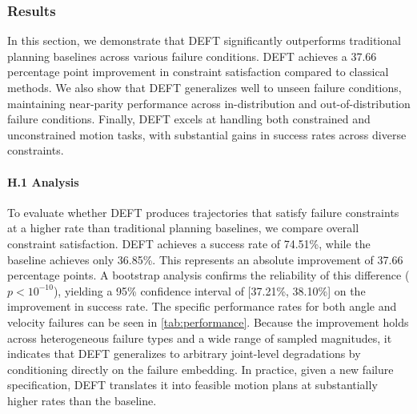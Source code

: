 \subsubsection{Results} \label{sec:sim-results}
In this section, we demonstrate that DEFT significantly outperforms traditional planning baselines across various failure conditions. DEFT achieves a 37.66 percentage point improvement in constraint satisfaction compared to classical methods. We also show that DEFT generalizes well to unseen failure conditions, maintaining near-parity performance across in-distribution and out-of-distribution failure conditions. Finally, DEFT excels at handling both constrained and unconstrained motion tasks, with substantial gains in success rates across diverse constraints.



\paragraph{\textbf{H.1} Analysis}%
To evaluate whether DEFT produces trajectories that satisfy failure constraints at a higher rate than traditional planning baselines, we compare overall constraint satisfaction. DEFT achieves a success rate of 74.51\%, while the baseline achieves only 36.85\%. This represents an absolute improvement of 37.66 percentage points. A bootstrap analysis confirms the reliability of this difference ($p < 10^{-10}$), yielding a 95\% confidence interval of [37.21\%, 38.10\%] on the improvement in success rate. The specific performance rates for both angle and velocity failures can be seen in \cref{tab:performance}. Because the improvement holds across heterogeneous failure types and a wide range of sampled magnitudes, it indicates that DEFT generalizes to arbitrary joint-level degradations by conditioning directly on the failure embedding. In practice, given a new failure specification, DEFT translates it into feasible motion plans at substantially higher rates than the baseline.
 \vspace{-5pt}

